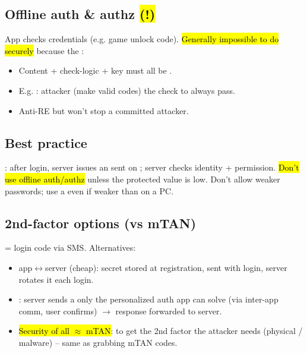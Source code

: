 \subsection{Offline auth \& authz \hl{(!)}}
App checks credentials  (e.g. game unlock code). \hl{Generally impossible to do securely} because the :
\begin{itemize}
\item Content + check-logic + key must all be .
\item E.g. : attacker  (make valid codes)   the check to always pass.
\item Anti-RE  but won't stop a committed attacker.
\end{itemize}
\subsection{Best practice}
: after login, server issues an  sent on ; server checks identity + permission. \hl{Don't use offline auth/authz} unless the protected value is low. Don't allow weaker passwords; use a  even if weaker than on a PC.
\subsection{2nd-factor options (vs mTAN)}
 = login code via SMS. Alternatives:
\begin{itemize}
\item {} app$\leftrightarrow$server (cheap): secret stored at registration, sent with login, server rotates it each login.
\item {}: server sends a  only the personalized auth app can solve (via inter-app comm, user confirms) $\to$ response forwarded to server.
\item \hl{Security of all $\approx$ mTAN}: to get the 2nd factor the attacker needs  (physical / malware) -- same as grabbing mTAN codes.
\end{itemize}

